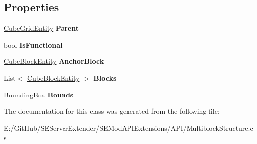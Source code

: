 \subsection*{Properties}
\begin{DoxyCompactItemize}
\item 
\hypertarget{class_s_e_mod_a_p_i_extensions_1_1_a_p_i_1_1_multiblock_structure_a614c357c1f702875896206893b6c7276}{}\hyperlink{class_s_e_mod_a_p_i_internal_1_1_a_p_i_1_1_entity_1_1_sector_1_1_sector_object_1_1_cube_grid_entity}{Cube\+Grid\+Entity} {\bfseries Parent}\label{class_s_e_mod_a_p_i_extensions_1_1_a_p_i_1_1_multiblock_structure_a614c357c1f702875896206893b6c7276}

\item 
\hypertarget{class_s_e_mod_a_p_i_extensions_1_1_a_p_i_1_1_multiblock_structure_a81c0eb25b64136df21f587a45a00f503}{}bool {\bfseries Is\+Functional}\label{class_s_e_mod_a_p_i_extensions_1_1_a_p_i_1_1_multiblock_structure_a81c0eb25b64136df21f587a45a00f503}

\item 
\hypertarget{class_s_e_mod_a_p_i_extensions_1_1_a_p_i_1_1_multiblock_structure_acdbfe31024798c0c5a83b0b2256d0157}{}\hyperlink{class_s_e_mod_a_p_i_internal_1_1_a_p_i_1_1_entity_1_1_sector_1_1_sector_object_1_1_cube_grid_1_1_cube_block_entity}{Cube\+Block\+Entity} {\bfseries Anchor\+Block}\label{class_s_e_mod_a_p_i_extensions_1_1_a_p_i_1_1_multiblock_structure_acdbfe31024798c0c5a83b0b2256d0157}

\item 
\hypertarget{class_s_e_mod_a_p_i_extensions_1_1_a_p_i_1_1_multiblock_structure_a8442fc1e7035fab2f63687b7c5b3bd6f}{}List$<$ \hyperlink{class_s_e_mod_a_p_i_internal_1_1_a_p_i_1_1_entity_1_1_sector_1_1_sector_object_1_1_cube_grid_1_1_cube_block_entity}{Cube\+Block\+Entity} $>$ {\bfseries Blocks}\label{class_s_e_mod_a_p_i_extensions_1_1_a_p_i_1_1_multiblock_structure_a8442fc1e7035fab2f63687b7c5b3bd6f}

\item 
\hypertarget{class_s_e_mod_a_p_i_extensions_1_1_a_p_i_1_1_multiblock_structure_a2b0507fb9444d14d02bbc337ebf36a52}{}Bounding\+Box {\bfseries Bounds}\label{class_s_e_mod_a_p_i_extensions_1_1_a_p_i_1_1_multiblock_structure_a2b0507fb9444d14d02bbc337ebf36a52}

\end{DoxyCompactItemize}


The documentation for this class was generated from the following file\+:\begin{DoxyCompactItemize}
\item 
E\+:/\+Git\+Hub/\+S\+E\+Server\+Extender/\+S\+E\+Mod\+A\+P\+I\+Extensions/\+A\+P\+I/Multiblock\+Structure.\+cs\end{DoxyCompactItemize}
